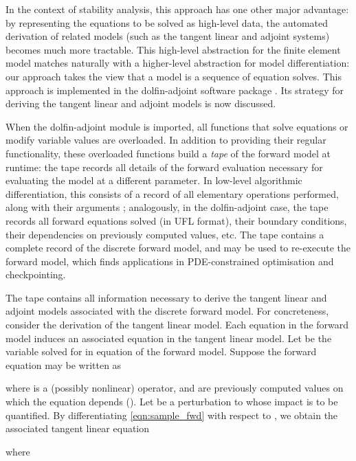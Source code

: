 \documentclass{siamltex}
\begin{document}
In the context of stability analysis, this approach has one other major advantage: by representing the equations
to be solved as high-level data, the automated derivation of related models (such as the tangent linear and adjoint
systems) becomes much more tractable. This high-level abstraction for the finite element model matches naturally with a higher-level abstraction
for model differentiation: our approach takes the view that a model is a sequence of equation solves.
This approach is implemented in the dolfin-adjoint software package \cite{farrell2012b}. Its strategy for deriving the tangent
linear and adjoint models is now discussed.

When the dolfin-adjoint module is imported, all functions that solve equations or modify variable values are overloaded. 
In addition to providing their regular functionality, these overloaded functions build
a \emph{tape} of the forward model at runtime: the tape records all details of the forward evaluation necessary for
evaluating the model at a different parameter. In low-level algorithmic differentiation, this consists of
a record of all elementary operations performed, along with their arguments \cite{griewank2008}; analogously, in the dolfin-adjoint case,
the tape records all forward equations solved (in UFL format), their boundary conditions, their dependencies on previously computed values, etc.
The tape contains a complete record of the discrete forward model, and may be used to re-execute the forward model, which
finds applications in PDE-constrained optimisation and checkpointing.

The tape contains all information necessary to derive the tangent linear and adjoint models associated with the discrete forward model.
For concreteness, consider the derivation of the
tangent linear model. Each equation in the forward model induces an associated equation in the tangent linear model.
Let  be the variable solved for in equation  of the forward model. Suppose the forward equation may be written
as

where  is a (possibly nonlinear) operator, and  are  previously computed values on which the equation depends ().
Let  be a perturbation to  whose impact is to be quantified.
By differentiating \eqref{eqn:sample_fwd} with respect to , we obtain the associated tangent linear equation

where 
\end{document}
